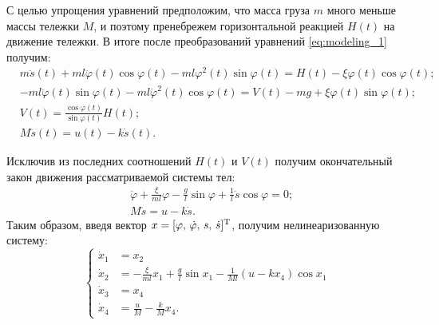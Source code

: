 С целью упрощения уравнений предположим, что масса груза $m$ много меньше массы тележки $M$, и поэтому пренебрежем горизонтальной реакцией $H(t)$ на движение тележки.
В итоге после преобразований уравнений \eqref{eq:modeling_1} получим:
\begin{equation*}
	\begin{aligned}
&m \ddot s(t) + ml\ddot\varphi(t)\cos\varphi(t) - ml\varphi^2(t)\sin\varphi(t) = H(t) - \xi\varphi(t)\cos\varphi(t);
\\
&-ml\ddot\varphi(t)\sin\varphi(t) - ml\dot\varphi^2(t)\cos\varphi(t) = V(t) - mg + \xi\varphi(t)\sin\varphi(t);
\\
&V(t) = \frac{\cos\varphi(t)}{\sin\varphi(t)}H(t);
\\
&M\ddot s(t) = u(t) - k\dot s(t).
	\end{aligned}
\end{equation*}

Исключив из последних соотношений $H(t)$ и $V(t)$ получим окончательный закон движения рассматриваемой системы тел:
\begin{equation}\label{eq:modeling_equation}
	\begin{aligned}
&\ddot\varphi + \frac{\xi}{ml}\varphi - \frac{g}{l}\sin\varphi + \frac{1}{l}\ddot s \cos \varphi = 0;
\\
&M\ddot s = u - k\dot s.
	\end{aligned}
\end{equation}
Таким образом, введя вектор $x = [\varphi,\,\dot\varphi,\,s,\,\dot s]^\mathrm{T}$, получим нелинеаризованную систему:
\begin{equation}\label{eq:modeling_system}
	\left\{
	\begin{aligned}
\dot x_1 &= x_2
\\
\dot x_2 &= -\frac{\xi}{ml}x_1 + \frac{g}{l}\sin x_1 - \frac{1}{Ml}(u - kx_4)\cos x_1
\\
\dot x_3 &= x_4
\\
\dot x_4 &= \frac{u}{M} - \frac{k}{M}x_4.
	\end{aligned}
	\right.
\end{equation}
